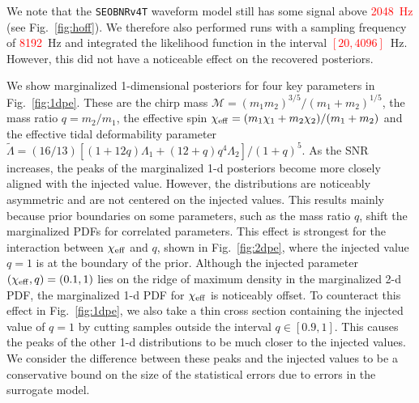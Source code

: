 \documentclass[prd,aps,letter,twocolumn,floatfix,notitlepage,nofootinbib]{revtex4-1}
\newcommand{\red}[1]{\textcolor{red}{#1}}
\begin{document}
We note that the \texttt{SEOBNRv4T} waveform model still has some signal above \red{2048~Hz} (see Fig.~\ref{fig:hoff}). We therefore also performed runs with a sampling frequency of \red{8192}~Hz and integrated the likelihood function in the interval \red{$[20, 4096]$}~Hz. However, this did not have a noticeable effect on the recovered posteriors.

We show marginalized 1-dimensional posteriors for four key parameters in Fig.~\ref{fig:1dpe}. These are the chirp mass $\mathcal{M} = (m_1 m_2)^{3/5}/(m_1+m_2)^{1/5}$, the mass ratio $q=m_2/m_1$, the effective spin $\chi_{\rm eff} = (m_1\chi_1+m_2\chi_2)/(m_1+m_2)$ and the effective tidal deformability parameter $\tilde\Lambda = (16/13) [(1+12q)\Lambda_1 + (12+q)q^4\Lambda_2]/(1+q)^5$. As the SNR increases, the peaks of the marginalized 1-d posteriors become more closely aligned with the injected value. However, the distributions are noticeably asymmetric and are not centered on the injected values. 
This results mainly because prior boundaries on some parameters, such as the mass ratio $q$, shift the marginalized PDFs for correlated parameters.
This effect is strongest for the interaction between $\chi_{\rm eff}$ and $q$, shown in Fig.~\ref{fig:2dpe}, where the injected value $q=1$ is at the boundary of the prior. Although the injected parameter $(\chi_{\rm eff}, q) = (0.1, 1)$ lies on the ridge of maximum density in the marginalized 2-d PDF, the marginalized 1-d PDF for $\chi_{\rm eff}$ is noticeably offset. To counteract this effect in Fig.~\ref{fig:1dpe}, we also take a thin cross section containing the injected value of $q=1$ by cutting samples outside the interval $q \in [0.9, 1]$. This causes the peaks of the other 1-d distributions to be much closer to the injected values. We consider the difference between these peaks and the injected values to be a conservative bound on the size of the statistical errors due to errors in the surrogate model.
\end{document}
